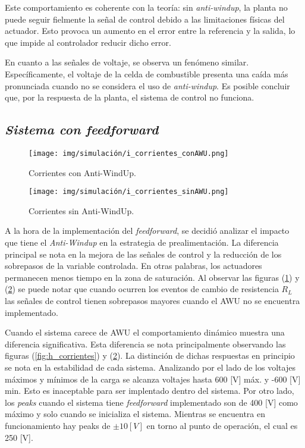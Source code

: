 Este comportamiento es coherente con la teoría: sin 
\textit{anti-windup}, la planta no puede seguir fielmente la señal de control debido a las limitaciones
físicas del actuador. Esto provoca un aumento en el error entre la referencia y la salida, 
lo que impide al controlador reducir dicho error.

En cuanto a las señales de voltaje, se observa un fenómeno similar. 
Específicamente, el voltaje de la celda de combustible presenta una 
caída más pronunciada cuando no se considera el uso de \textit{anti-windup}. Es posible concluir que, por la respuesta
de la planta, el sistema de control no funciona.
\subsection{\textit{Sistema con feedforward}}

\begin{figure}[H]
    \centering
    \texttt{[image: img/simulación/i\_corrientes\_conAWU.png]}
    \caption{Corrientes con Anti-WindUp.}
    \label{fig:i_corrientes_conAWU}
\end{figure}

\begin{figure}[H]
    \centering
    \texttt{[image: img/simulación/i\_corrientes\_sinAWU.png]}
    \caption{Corrientes sin Anti-WindUp.}
    \label{fig:i_corrientes_sinAWU}
\end{figure}

A la hora de la implementación del \textit{feedforward}, se decidió 
analizar el impacto que tiene el \textit{Anti-Windup} en la estrategia de prealimentación.
La diferencia principal se nota en la mejora de las señales de control y la reducción de los sobrepasos de la 
variable controlada. En otras palabras, los actuadores permanecen menos tiempo en la zona de saturación.
Al observar las figuras (\ref{fig:i_corrientes_conAWU}) y (\ref{fig:i_corrientes_sinAWU})
se puede notar que cuando ocurren los eventos de cambio de resistencia $R_L$ las señales de control
tienen sobrepasos mayores cuando el AWU no se encuentra implementado. 

Cuando el sistema carece de AWU el comportamiento dinámico 
muestra una diferencia significativa. Esta diferencia se nota principalmente observando las 
figuras (\ref{fig:h_corrientes}) y (\ref{fig:i_corrientes_sinAWU}).
La distinción de dichas respuestas en principio se nota en la estabilidad de cada sistema. Analizando por el lado de los
voltajes máximos y mínimos de la carga se alcanza voltajes hasta 600 [V] máx. y -600 [V] min. Esto es inaceptable
para ser implentado dentro del sistema. Por otro lado, los \textit{peaks} cuando el sistema tiene \textit{feedforward}
implementado son de 400 [V] como máximo y solo cuando se inicializa el sistema. Mientras se encuentra en funcionamiento
hay peaks de $\pm 10 [V]$ en torno al punto de operación, el cual es 250 [V].


